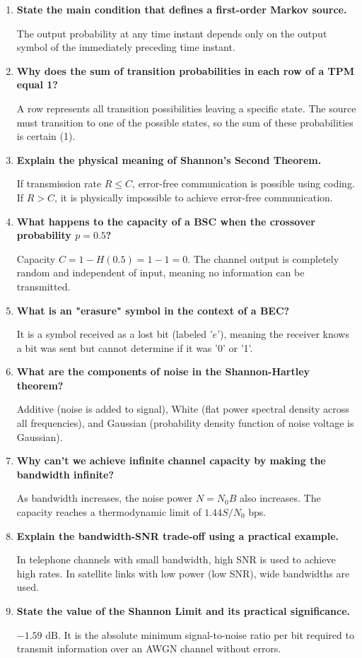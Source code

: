 \documentclass[12pt,a4paper]{article}
\newcommand{\Q}[1]{\textbf{#1}\par\noindent\ignorespaces}
\begin{document}
\begin{tcolorbox}[exambox, title={\textbf{Frequently Asked / Viva Questions}}]
\begin{enumerate}[topsep=0pt, label=\textbf{Q\arabic*.}, itemsep=5pt]
  \item \Q{State the main condition that defines a first-order Markov source.}
    The output probability at any time instant depends only on the output symbol of the immediately preceding time instant.
  \item \Q{Why does the sum of transition probabilities in each row of a TPM equal 1?}
    A row represents all transition possibilities leaving a specific state. The source must transition to one of the possible states, so the sum of these probabilities is certain (1).
  \item \Q{Explain the physical meaning of Shannon's Second Theorem.}
    If transmission rate $R \le C$, error-free communication is possible using coding. If $R > C$, it is physically impossible to achieve error-free communication.
  \item \Q{What happens to the capacity of a BSC when the crossover probability $p = 0.5$?}
    Capacity $C = 1 - H(0.5) = 1 - 1 = 0$. The channel output is completely random and independent of input, meaning no information can be transmitted.
  \item \Q{What is an "erasure" symbol in the context of a BEC?}
    It is a symbol received as a lost bit (labeled '$e$'), meaning the receiver knows a bit was sent but cannot determine if it was '0' or '1'.
  \item \Q{What are the components of noise in the Shannon-Hartley theorem?}
    Additive (noise is added to signal), White (flat power spectral density across all frequencies), and Gaussian (probability density function of noise voltage is Gaussian).
  \item \Q{Why can't we achieve infinite channel capacity by making the bandwidth infinite?}
    As bandwidth increases, the noise power $N = N_0 B$ also increases. The capacity reaches a thermodynamic limit of $1.44 S/N_0$ bps.
  \item \Q{Explain the bandwidth-SNR trade-off using a practical example.}
    In telephone channels with small bandwidth, high SNR is used to achieve high rates. In satellite links with low power (low SNR), wide bandwidths are used.
  \item \Q{State the value of the Shannon Limit and its practical significance.}
    $-1.59 \text{ dB}$. It is the absolute minimum signal-to-noise ratio per bit required to transmit information over an AWGN channel without errors.

\end{enumerate}
\end{tcolorbox}
\end{document}

